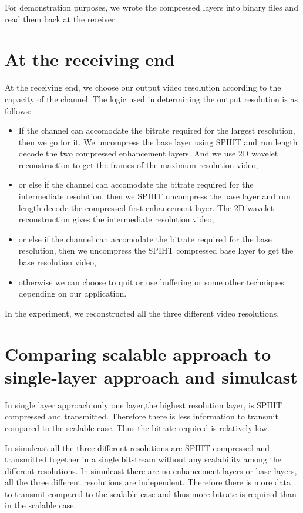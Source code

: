 \documentclass[10pt,twocolumn]{article}
\begin{document}
For demonstration purposes, we wrote the compressed layers into binary files and read them back at the receiver.

\section{At the receiving end}

At the receiving end, we choose our output video resolution according to the capacity of the channel. The logic used in determining the output resolution is as follows:
\begin{itemize}
    \item If the channel can accomodate the bitrate required for the largest resolution, then we go for it. We uncompress the base layer using SPIHT\cite{amirSaid1996} and run length decode the two compressed enhancement layers. And we use 2D wavelet reconstruction to get the frames of the maximum resolution video,
    \item or else if the channel can accomodate the bitrate required for the intermediate resolution, then we SPIHT uncompress the base layer and run length decode the compressed first enhancement layer. The 2D wavelet reconstruction gives the intermediate resolution video,
    \item or else if the channel can accomodate the bitrate required for the base resolution, then we uncompress the SPIHT compressed base layer to get the base resolution video,
    \item otherwise we can choose to quit or use buffering or some other techniques depending on our application.
\end{itemize}

In the experiment, we reconstructed all the three different video resolutions.


\section{Comparing scalable approach to single-layer approach and simulcast}

In single layer approach only one layer,the highest resolution layer, is SPIHT compressed and transmitted. Therefore there is less information to transmit compared to the scalable case. Thus the bitrate required is relatively low.

In simulcast all the three different resolutions are SPIHT compressed and transmitted together in a single bitstream without any scalability among the different resolutions. In simulcast there are no enhancement layers or base layers, all the three different resolutions are independent. Therefore there is more data to transmit compared to the scalable case and thus more bitrate is required than in the scalable case.
\end{document}
